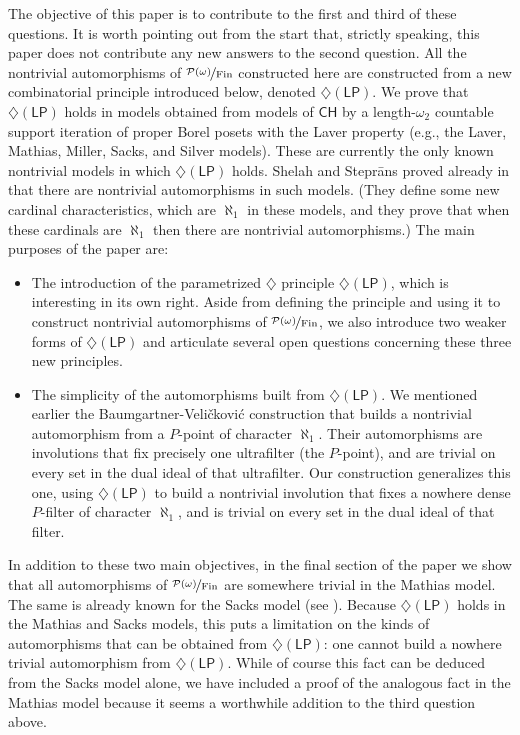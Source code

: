 \documentclass[11pt,leqno]{amsart}
\theoremstyle{definition}
\theoremstyle{remark}
\newcommand{\<}{\langle}
\renewcommand{\>}{\rangle}
\newcommand{\w}{\omega}
\newcommand{\0}{\emptyset}
\newcommand{\1}{1\hspace{-1.75mm}1}
\newcommand{\pwmf}{\nicefrac{\mathcal{P}(\w)}{\mathrm{Fin}}}
\newcommand{\pfa}{\ensuremath{\mathsf{PFA}}\xspace}
\newcommand{\ma}{\ensuremath{\mathsf{MA}}\xspace}
\newcommand{\dLP}{\diamondsuit(\mathsf{LP})}
\begin{document}
The objective of this paper is to contribute to the first and third of these questions. 
It is worth pointing out from the start that, strictly speaking, this paper does not contribute any new answers to the second question. 
All the nontrivial automorphisms of $\pwmf$ constructed here are constructed from a new combinatorial principle introduced below, denoted $\dLP$. 
We prove that $\dLP$ holds in models obtained from models of $\mathsf{CH}$ by a length-$\omega_2$ countable support iteration of proper Borel posets with the Laver property (e.g., the Laver, Mathias, Miller, Sacks, and Silver models). 
These are currently the only known nontrivial models in which $\dLP$ holds. 
Shelah and Stepr\={a}ns proved already in \cite{SS3} that there are nontrivial automorphisms in such models. (They define some new cardinal characteristics, which are $\aleph_1$ in these models, and they prove that when these cardinals are $\aleph_1$ then there are nontrivial automorphisms.) The main purposes of the paper are: 
\begin{itemize}
\item[$\circ$] The introduction of the parametrized $\diamondsuit$ principle $\dLP$, which is interesting in its own right. Aside from defining the principle and using it to construct nontrivial automorphisms of $\pwmf$, we also introduce two weaker forms of $\dLP$ and articulate several open questions concerning these three new principles. 
\item[$\circ$] The simplicity of the automorphisms built from $\dLP$. 
We mentioned earlier the Baumgartner-Veli\v{c}kovi\'c construction that builds a nontrivial automorphism from a $P$-point of character $\aleph_1$. 
Their automorphisms are involutions that fix precisely one ultrafilter (the $P$-point), and are trivial on every set in the dual ideal of that ultrafilter. 
Our construction generalizes this one, using $\dLP$ to build a nontrivial involution that fixes a nowhere dense $P$-filter of character $\aleph_1$, and is trivial on every set in the dual ideal of that filter. 
\end{itemize}


In addition to these two main objectives, in the final section of the paper we show that all automorphisms of $\pwmf$ are somewhere trivial in the Mathias model. 
The same is already known for the Sacks model (see \cite{SS2}). 
Because $\dLP$ holds in the Mathias and Sacks models, this puts a limitation on the kinds of automorphisms that can be obtained from $\dLP$: one cannot build a nowhere trivial automorphism from $\dLP$.  
While of course this fact can be deduced from the Sacks model alone, we have included a proof of the analogous fact in the Mathias model because it seems a worthwhile addition to the third question above. 
\end{document}
